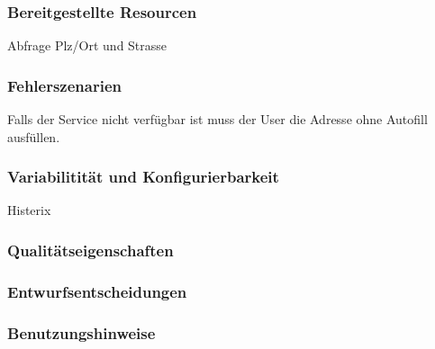 \subsubsection{Bereitgestellte Resourcen}
Abfrage Plz/Ort und Strasse

\subsubsection{Fehlerszenarien}
Falls der Service nicht verfügbar ist muss der User die Adresse ohne Autofill ausfüllen.

\subsubsection{Variabilitität und Konfigurierbarkeit}
Histerix

\subsubsection{Qualitätseigenschaften}

\subsubsection{Entwurfsentscheidungen} 

\subsubsection{Benutzungshinweise} 



